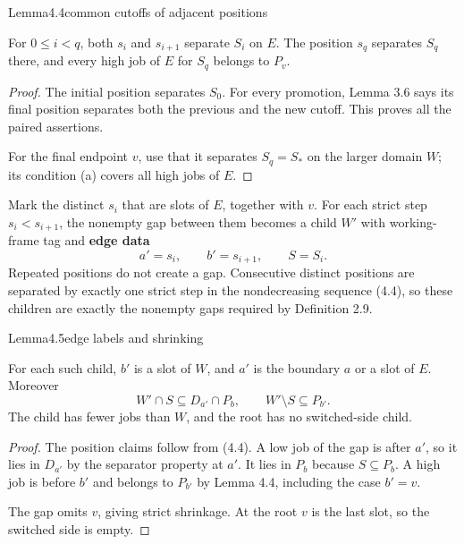 \begin{numbered}{Lemma}{4.4}{common cutoffs of adjacent positions}

For \(0\leq i<q\), both \(s_i\) and \(s_{i+1}\) separate \(S_i\) on \(E\). The position \(s_q\) separates \(S_q\) there, and every high job of \(E\) for \(S_q\) belongs to \(P_v\).

\end{numbered}

\begin{proof}
The initial position separates \(S_0\). For every promotion, Lemma 3.6 says its final position separates both the previous and the new cutoff. This proves all the paired assertions.

For the final endpoint \(v\), use that it separates \(S_q=S_*\) on the larger domain \(W\); its condition (a) covers all high jobs of \(E\).
\end{proof}

Mark the distinct \(s_i\) that are slots of \(E\), together with \(v\). For each strict step \(s_i<s_{i+1}\), the nonempty gap between them becomes a child \(W'\) with working-frame tag and \textbf{edge data} \[
a'=s_i,\qquad b'=s_{i+1},\qquad S=S_i.
\tag{4.5}
\] Repeated positions do not create a gap. Consecutive distinct positions are separated by exactly one strict step in the nondecreasing sequence (4.4), so these children are exactly the nonempty gaps required by Definition 2.9.

\begin{numbered}{Lemma}{4.5}{edge labels and shrinking}

For each such child, \(b'\) is a slot of \(W\), and \(a'\) is the boundary \(a\) or a slot of \(E\). Moreover \[
W'\cap S\subseteq D_{a'}\cap P_b,\qquad
W'\setminus S\subseteq P_{b'}.
\tag{4.6}
\] The child has fewer jobs than \(W\), and the root has no switched-side child.

\end{numbered}

\begin{proof}
The position claims follow from (4.4). A low job of the gap is after \(a'\), so it lies in \(D_{a'}\) by the separator property at \(a'\). It lies in \(P_b\) because \(S\subseteq P_b\). A high job is before \(b'\) and belongs to \(P_{b'}\) by Lemma 4.4, including the case \(b'=v\).

The gap omits \(v\), giving strict shrinkage. At the root \(v\) is the last slot, so the switched side is empty.
\end{proof}


